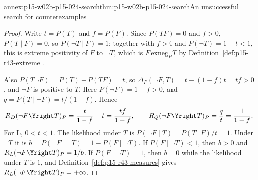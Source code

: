 \begin{annexitem}{annex:p15-w02b-p15-024-search}{thm:p15-w02b-p15-024-search}{An unsuccessful search for counterexamples}
\begin{proof}
Write \(t=P(T)\) and \(f=P(F)\). Since \(P(TF)=0\) and \(f>0\),
\(P(T\mid F)=0\), so \(P(\neg T\mid F)=1\); together with \(f>0\) and
\(P(\neg T)=1-t<1\), this is extreme positivity of \(F\) to \(\neg T\),
which is \(F\,\mathrm{exneg}_P\,T\) by
Definition~\ref{def:p15-r43-extreme}.

Also \(P(T\neg F)=P(T)-P(TF)=t\), so
\(\Delta_P(\neg F,T)=t-(1-f)t=tf>0\), and \(\neg F\) is positive to
\(T\). Here \(P(\neg F)=1-f>0\), and
\(q=P(T\mid\neg F)=t/(1-f)\). Hence
\[
 R_D(\neg F\Yright T)_P=\frac{t}{1-f}-t=\frac{tf}{1-f},\qquad
 R_Q(\neg F\Yright T)_P=\frac{q}{t}=\frac1{1-f}.
\]
For L, \(0<t<1\). The likelihood under \(T\) is
\(P(\neg F\mid T)=P(T\neg F)/t=1\). Under \(\neg T\) it is
\(b=P(\neg F\mid\neg T)=1-P(F\mid\neg T)\). If \(P(F\mid\neg T)<1\),
then \(b>0\) and \(R_L(\neg F\Yright T)_P=1/b\). If
\(P(F\mid\neg T)=1\), then \(b=0\) while the likelihood under \(T\) is
\(1\), and Definition~\ref{def:p15-r43-measures} gives
\(R_L(\neg F\Yright T)_P=+\infty\).
\end{proof}
\end{annexitem}

